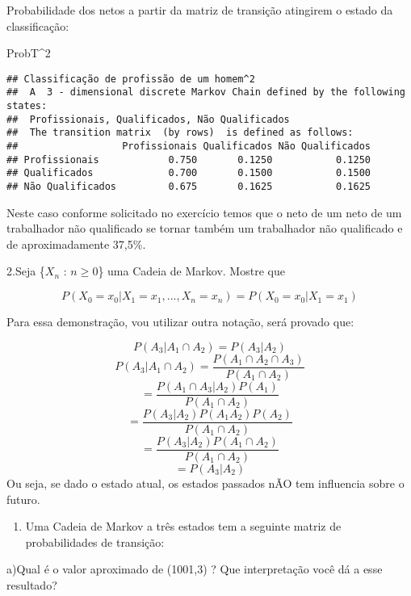 \documentclass[
]{article}
\newenvironment{Shaded}{\begin{snugshade}}{\end{snugshade}}
\newcommand{\DecValTok}[1]{\textcolor[rgb]{0.00,0.00,0.81}{#1}}
\newcommand{\NormalTok}[1]{#1}
\newcommand{\OperatorTok}[1]{\textcolor[rgb]{0.81,0.36,0.00}{\textbf{#1}}}
\providecommand{\tightlist}{%
  \setlength{\itemsep}{0pt}\setlength{\parskip}{0pt}}
\begin{document}
Probabilidade dos netos a partir da matriz de transição atingirem o
estado da classificação:

\begin{Shaded}
\begin{Highlighting}[]
\NormalTok{ProbT}\OperatorTok{^}\DecValTok{2}
\end{Highlighting}
\end{Shaded}

\begin{verbatim}
## Classificação de profissão de um homem^2 
##  A  3 - dimensional discrete Markov Chain defined by the following states: 
##  Profissionais, Qualificados, Não Qualificados 
##  The transition matrix  (by rows)  is defined as follows: 
##                  Profissionais Qualificados Não Qualificados
## Profissionais            0.750       0.1250           0.1250
## Qualificados             0.700       0.1500           0.1500
## Não Qualificados         0.675       0.1625           0.1625
\end{verbatim}

Neste caso conforme solicitado no exercício temos que o neto de um neto
de um trabalhador não qualificado se tornar também um trabalhador não
qualificado e de aproximadamente 37,5\%.

2.Seja \{\(X_n\) : \(n \geq 0\)\} uma Cadeia de Markov. Mostre que

\[P(X_0=x_0|X_1=x_1,...,X_n=x_n)=P(X_0=x_0|X_1=x_1)\]

Para essa demonstração, vou utilizar outra notação, será provado que:

\[P(A_{3}|A_{1}\cap A_{2})=P(A_{3}|A_{2})\]
\[P(A_{3}|A_{1}\cap A_{2})=\frac{P(A_{1}\cap A_{2} \cap A_{3})}{P(A_{1}\cap A_{2})}\]
\[=\frac{P(A_{1}\cap A_{3}|A_{2})P(A_{1})}{P(A_{1}\cap A_{2})}\]
\[=\frac{P(A_{3}|A_{2})P(A_{1}A_{2})P(A_{2})}{P(A_{1}\cap A_{2})}\]
\[=\frac{P(A_{3}|A_{2})P(A_{1}\cap A_{2})}{P(A_{1}\cap A_{2})}\]
\[=P(A_{3}|A_{2})\] Ou seja, se dado o estado atual, os estados passados
nÃO tem influencia sobre o futuro.

\begin{enumerate}
\def\labelenumi{\arabic{enumi}.}
\setcounter{enumi}{2}
\tightlist
\item
  Uma Cadeia de Markov a três estados tem a seguinte matriz de
  probabilidades de transição:
\end{enumerate}

a)Qual é o valor aproximado de (1001,3) ? Que interpretação você dá a
esse resultado?
\end{document}
